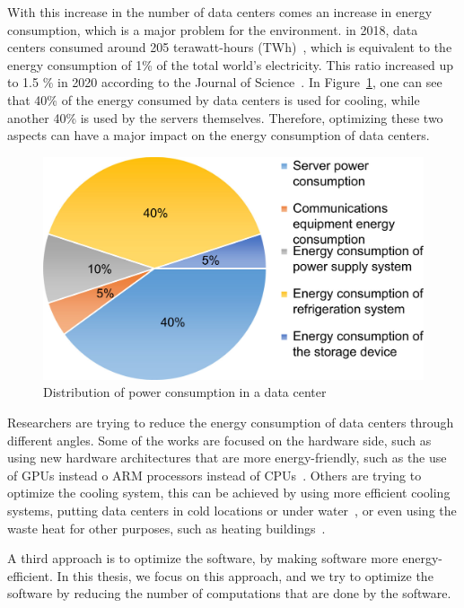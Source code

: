 With this increase in the number of data centers comes an increase in energy consumption, which is a major problem for the environment.
in 2018, data centers consumed around 205 terawatt-hours (TWh)~\cite{schneider2021world}, which is equivalent to the energy consumption of 1\% of the total world's electricity.
This ratio increased up to 1.5 \% in 2020 according to the Journal of Science~\cite{mytton2021data}.
In Figure~\ref{fig:data_centers_power_distribution}, one can see that 40\% of the energy consumed by data centers is used for cooling, while another 40\% is used by the servers themselves.
Therefore, optimizing these two aspects can have a major impact on the energy consumption of data centers.

\begin{figure}[!h]
    \centering
    \includegraphics[width=0.6\linewidth]{chapters/data_centers_power_distribution}
    \caption{Distribution of power consumption in a data center~\cite{rong2016optimizing}}
    \label{fig:data_centers_power_distribution}
\end{figure}

Researchers are trying to reduce the energy consumption of data centers through different angles.
Some of the works are focused on the hardware side, such as using new hardware architectures that are more energy-friendly, such as the use of GPUs instead o ARM processors instead of CPUs~\cite{aroca2012towards}.
Others are trying to optimize the cooling system, this can be achieved by using more efficient cooling systems, putting data centers in cold locations or under water~\cite{simon2018project}, or even using the waste heat for other purposes, such as heating buildings~\cite{bouzel2021distributed,cao2021carbon}.

A third approach is to optimize the software, by making software more energy-efficient.
In this thesis, we focus on this approach, and we try to optimize the software by reducing the number of computations that are done by the software.

